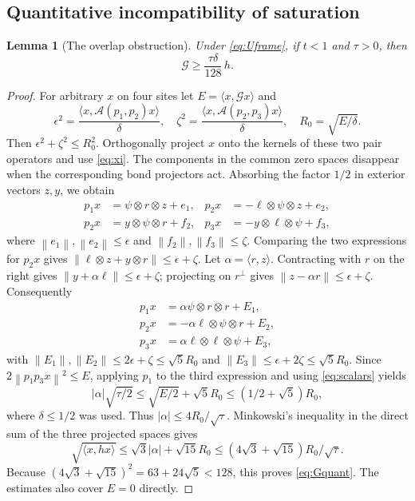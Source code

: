 \documentclass[11pt,a4paper]{article}
\newtheorem{lemma}[theorem]{Lemma}
\theoremstyle{remark}\newtheorem{remark}[theorem]{Remark}
\newcommand{\norm}[1]{\left\lVert #1\right\rVert}
\begin{document}
\subsection{Quantitative incompatibility of saturation}
\begin{lemma}[The overlap obstruction]\label{lem:quantitative}
Under \eqref{eq:Uframe}, if $t<1$ and $\tau>0$, then
\begin{equation}\label{eq:Gquant}
 \mathcal G\ge\frac{\tau\delta}{128}\,h.
\end{equation}
\end{lemma}
\begin{proof}
For arbitrary $x$ on four sites let $E=\langle x,\mathcal Gx\rangle$ and
\[
 \epsilon^2=\frac{\langle x,\mathcal A(p_1,p_2)x\rangle}{\delta},\quad
 \zeta^2=\frac{\langle x,\mathcal A(p_2,p_3)x\rangle}{\delta},\quad
 R_0=\sqrt{E/\delta}.
\]
Then $\epsilon^2+\zeta^2\le R_0^2$. Orthogonally project $x$ onto the kernels of these two pair operators and use \eqref{eq:xi}. The components in the common zero spaces disappear when the corresponding bond projectors act. Absorbing the factor $1/2$ in exterior vectors $z,y$, we obtain
\begin{align*}
 p_1x&=\psi\otimes r\otimes z+e_1,&
 p_2x&=-\ell\otimes\psi\otimes z+e_2,\\
 p_2x&=y\otimes\psi\otimes r+f_2,&
 p_3x&=-y\otimes\ell\otimes\psi+f_3,
\end{align*}
where $\norm{e_1},\norm{e_2}\le\epsilon$ and $\norm{f_2},\norm{f_3}\le\zeta$.
Comparing the two expressions for $p_2x$ gives
$\norm{\ell\otimes z+y\otimes r}\le\epsilon+\zeta$.
Let $\alpha=\langle r,z\rangle$. Contracting with $r$ on the right gives $\norm{y+\alpha\ell}\le\epsilon+\zeta$; projecting on $r^\perp$ gives $\norm{z-\alpha r}\le\epsilon+\zeta$. Consequently
\begin{align*}
 p_1x&=\alpha\psi\otimes r\otimes r+E_1,\\
 p_2x&=-\alpha\ell\otimes\psi\otimes r+E_2,\\
 p_3x&=\alpha\ell\otimes\ell\otimes\psi+E_3,
\end{align*}
with $\norm{E_1},\norm{E_2}\le2\epsilon+\zeta\le\sqrt5R_0$ and
$\norm{E_3}\le\epsilon+2\zeta\le\sqrt5R_0$.
Since $2\norm{p_1p_3x}^2\le E$, applying $p_1$ to the third expression and using \eqref{eq:scalars} yields
\[
 |\alpha|\sqrt{\tau/2}\le\sqrt{E/2}+\sqrt5R_0
 \le(1/2+\sqrt5)R_0,
\]
where $\delta\le1/2$ was used. Thus $|\alpha|\le4R_0/\sqrt\tau$.
Minkowski's inequality in the direct sum of the three projected spaces gives
\[
 \sqrt{\langle x,hx\rangle}
 \le\sqrt3|\alpha|+\sqrt{15}R_0
 \le(4\sqrt3+\sqrt{15})R_0/\sqrt\tau.
\]
Because $(4\sqrt3+\sqrt{15})^2=63+24\sqrt5<128$, this proves \eqref{eq:Gquant}. The estimates also cover $E=0$ directly.
\end{proof}
\end{document}
